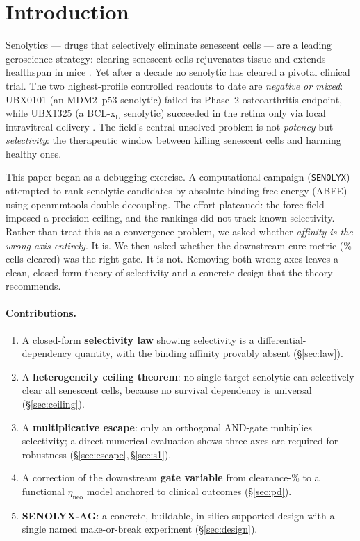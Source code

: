 \documentclass[11pt,a4paper]{article}
\begin{document}
\tableofcontents
\bigskip

\section{Introduction}
\label{sec:intro}

Senolytics --- drugs that selectively eliminate senescent cells --- are a
leading geroscience strategy: clearing senescent cells rejuvenates tissue and
extends healthspan in mice \citep{baker2011,baker2016}. Yet after a decade no
senolytic has cleared a pivotal clinical trial. The two highest-profile
controlled readouts to date are \emph{negative or mixed}: UBX0101 (an
MDM2--p53 senolytic) failed its Phase~2 osteoarthritis endpoint, while UBX1325
(a BCL-x$_{\mathrm L}$ senolytic) succeeded in the retina only via local
intravitreal delivery \citep{ubx1325}. The field's central unsolved problem is
not \emph{potency} but \emph{selectivity}: the therapeutic window between
killing senescent cells and harming healthy ones.

This paper began as a debugging exercise. A computational campaign
(\texttt{SENOLYX}) attempted to rank senolytic candidates by absolute binding
free energy (ABFE) using openmmtools double-decoupling. The effort plateaued:
the force field imposed a precision ceiling, and the rankings did not track
known selectivity. Rather than treat this as a convergence problem, we asked
whether \emph{affinity is the wrong axis entirely}. It is. We then asked
whether the downstream cure metric (\% cells cleared) was the right gate. It is
not. Removing both wrong axes leaves a clean, closed-form theory of selectivity
and a concrete design that the theory recommends.

\paragraph{Contributions.}
\begin{enumerate}
\item A closed-form \textbf{selectivity law} showing selectivity is a
  differential-dependency quantity, with the binding affinity provably absent
  (\S\ref{sec:law}).
\item A \textbf{heterogeneity ceiling theorem}: no single-target senolytic can
  selectively clear all senescent cells, because no survival dependency is
  universal (\S\ref{sec:ceiling}).
\item A \textbf{multiplicative escape}: only an orthogonal AND-gate multiplies
  selectivity; a direct numerical evaluation shows three axes are required for
  robustness (\S\ref{sec:escape},\,\S\ref{sec:s1}).
\item A correction of the downstream \textbf{gate variable} from clearance-\%
  to a functional $\eta_{\mathrm{neo}}$ model anchored to clinical outcomes
  (\S\ref{sec:pd}).
\item \textbf{SENOLYX-AG}: a concrete, buildable, in-silico-supported design
  with a single named make-or-break experiment (\S\ref{sec:design}).
\end{enumerate}
\end{document}
